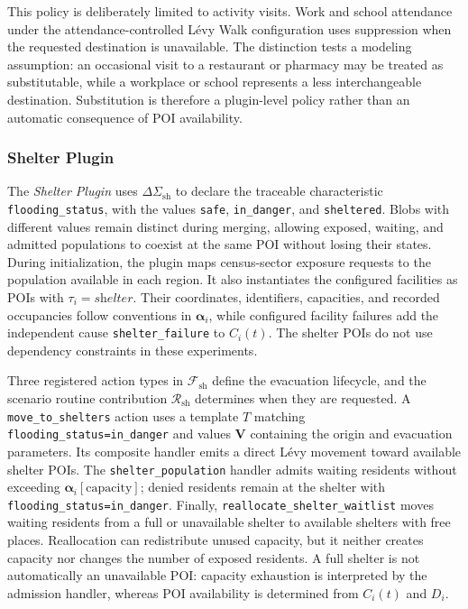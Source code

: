 This policy is deliberately limited to activity visits. Work and school attendance under the attendance-controlled L\'evy Walk configuration uses suppression when the requested destination is unavailable. The distinction tests a modeling assumption: an occasional visit to a restaurant or pharmacy may be treated as substitutable, while a workplace or school represents a less interchangeable destination. Substitution is therefore a plugin-level policy rather than an automatic consequence of POI availability.

\subsubsection{Shelter Plugin}

The \textit{Shelter Plugin} uses $\Delta\Sigma_{\mathrm{sh}}$ to declare the traceable characteristic \texttt{flooding\_status}, with the values \texttt{safe}, \texttt{in\_danger}, and \texttt{sheltered}. Blobs with different values remain distinct during merging, allowing exposed, waiting, and admitted populations to coexist at the same POI without losing their states. During initialization, the plugin maps census-sector exposure requests to the population available in each region. It also instantiates the configured facilities as POIs with $\tau_i=\textit{shelter}$. Their coordinates, identifiers, capacities, and recorded occupancies follow conventions in $\bm{\alpha}_i$, while configured facility failures add the independent cause \texttt{shelter\_failure} to $C_i(t)$. The shelter POIs do not use dependency constraints in these experiments.

Three registered action types in $\mathcal{F}_{\mathrm{sh}}$ define the evacuation lifecycle, and the scenario routine contribution $\mathcal{R}_{\mathrm{sh}}$ determines when they are requested. A \texttt{move\_to\_shelters} action uses a template $T$ matching \texttt{flooding\_status=in\_danger} and values $\bm{V}$ containing the origin and evacuation parameters. Its composite handler emits a direct L\'evy movement toward available shelter POIs. %
The \texttt{shelter\_population} handler admits waiting residents without exceeding $\bm{\alpha}_i[\mathrm{capacity}]$; denied residents remain at the shelter with \texttt{flooding\_status=in\_danger}. Finally, \texttt{reallocate\_shelter\_waitlist} moves waiting residents from a full or unavailable shelter to available shelters with free places. Reallocation can redistribute unused capacity, but it neither creates capacity nor changes the number of exposed residents. A full shelter is not automatically an unavailable POI: capacity exhaustion is interpreted by the admission handler, whereas POI availability is determined from $C_i(t)$ and $D_i$.

